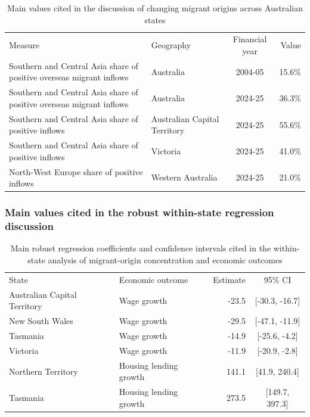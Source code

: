 \documentclass[
  11pt,
  a4paper,
]{article}
\begin{document}
\begin{longtable}[t]{>{\raggedright\arraybackslash}p{6cm}lcr}

\caption{\label{tbl-app-q2-origin-values}Main values cited in the
discussion of changing migrant origins across Australian states}

\tabularnewline

\\
\toprule
Measure & Geography & Financial year & Value\\
\midrule
Southern and Central Asia share of positive overseas migrant inflows & Australia & 2004-05 & 15.6\%\\
Southern and Central Asia share of positive overseas migrant inflows & Australia & 2024-25 & 36.3\%\\
Southern and Central Asia share of positive inflows & Australian Capital Territory & 2024-25 & 55.6\%\\
Southern and Central Asia share of positive inflows & Victoria & 2024-25 & 41.0\%\\
North-West Europe share of positive inflows & Western Australia & 2024-25 & 21.0\%\\
\bottomrule

\end{longtable}

\subsubsection{Main values cited in the robust within-state regression
discussion}\label{main-values-cited-in-the-robust-within-state-regression-discussion}

\begin{longtable}[t]{llrc}

\caption{\label{tbl-app-q2-robust-values}Main robust regression
coefficients and confidence intervals cited in the within-state analysis
of migrant-origin concentration and economic outcomes}

\tabularnewline

\\
\toprule
State & Economic outcome & Estimate & 95\% CI\\
\midrule
Australian Capital Territory & Wage growth & -23.5 & {}[-30.3, -16.7]\\
New South Wales & Wage growth & -29.5 & {}[-47.1, -11.9]\\
Tasmania & Wage growth & -14.9 & {}[-25.6, -4.2]\\
Victoria & Wage growth & -11.9 & {}[-20.9, -2.8]\\
Northern Territory & Housing lending growth & 141.1 & {}[41.9, 240.4]\\
\addlinespace
Tasmania & Housing lending growth & 273.5 & {}[149.7, 397.3]\\
\bottomrule

\end{longtable}
\end{document}
